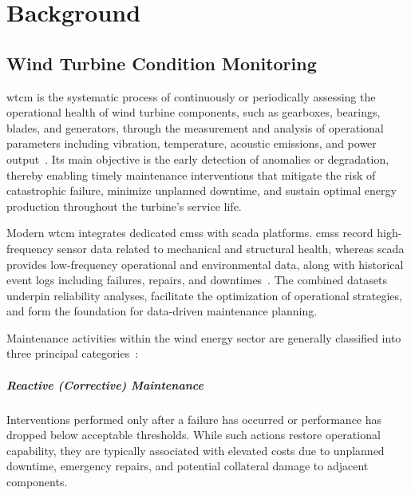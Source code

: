 
\chapter{Background}
\label{ch:background}

\ifpdf
    \graphicspath{{2_background/figures/PNG/}{2_background/figures/PDF/}{2_background/figures/}}
\else
    \graphicspath{{2_background/figures/EPS/}{2_background/figures/}}
\fi


\section{Wind Turbine Condition Monitoring}
\label{sec:wt-condition-monitoring}

\gls{wtcm} is the systematic process of continuously or periodically assessing the operational health of wind turbine components, such as gearboxes, bearings, blades, and generators, through the measurement and analysis of operational parameters including vibration, temperature, acoustic emissions, and power output~\citep{li_comprehensive_2023,charabi_wind_2020,henrique_global_nodate}.
Its main objective is the early detection of anomalies or degradation, thereby enabling timely maintenance interventions that mitigate the risk of catastrophic failure, minimize unplanned downtime, and sustain optimal energy production throughout the turbine's service life.

Modern \gls{wtcm} integrates dedicated \glspl{cms} with \gls{scada} platforms.
\glspl{cms} record high-frequency sensor data related to mechanical and structural health, whereas \gls{scada} provides low-frequency operational and environmental data, along with historical event logs including failures, repairs, and downtimes~\citep{dao_wind_2019}.
The combined datasets underpin reliability analyses, facilitate the optimization of operational strategies, and form the foundation for data-driven maintenance planning.

Maintenance activities within the wind energy sector are generally classified into three principal categories~\citep{yang_operations_2021,henrique_global_nodate}:
\paragraph{Reactive (Corrective) Maintenance}
Interventions performed only after a failure has occurred or performance has dropped below acceptable thresholds.
While such actions restore operational capability, they are typically associated with elevated costs due to unplanned downtime, emergency repairs, and potential collateral damage to adjacent components.
